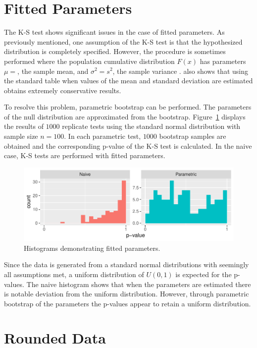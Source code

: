\documentclass[12pt, letterpaper, titlepage]{article}
\makeatletter
\newcommand*{\Xbar}{}%
\DeclareRobustCommand*{\Xbar}{%
  \mathpalette\@Xbar{}%
}
\newcommand*{\@Xbar}[2]{%
  \sbox0{$#1\mathrm{X}\m@th$}%
  \sbox2{$#1X\m@th$}%
  \rlap{%
    \hbox to\wd2{%
      \hfill
      $\overline{%
        \vrule width 0pt height\ht0 %
        \kern\wd0 %
      }$%
    }%
  }%
  \copy2 %
}
\makeatother
\begin{document}
\hypertarget{sec:fitted}{%
\section{Fitted Parameters}\label{sec:fitted}}

The K-S test shows significant issues in the case of fitted parameters. As previously mentioned, one assumption of the K-S test is that the hypothesized distribution is completely specified. However, the procedure is sometimes performed where the population cumulative distribution $F(x)$ has parameters $\mu=\Xbar$, the sample mean, and $\sigma^2=s^2$, the sample variance \citep{Lilliefors}. \citet{Lilliefors} also shows that using the standard table when values of the mean and standard deviation are estimated obtains extremely conservative results. 

To resolve this problem, parametric bootstrap can be performed. The parameters of the null distribution are approximated from the bootstrap. Figure~\ref{fig:hist_parametric} displays the results of $1000$ replicate tests using the standard normal distribution with sample size $n=100$. In each parametric test, $1000$ bootstrap samples are obtained and the corresponding p-value of the K-S test is calculated. In the naive case, K-S tests are performed with fitted parameters.

\begin{figure}[tbp]
  \centering
  \includegraphics{hist_parametric}
  \caption{Histograms demonstrating fitted parameters.}
  \label{fig:hist_parametric}
\end{figure}

Since the data is generated from a standard normal distributions with seemingly all assumptions met, a uniform distribution of $U(0,1)$ is expected for the p-values. The naive histogram shows that when the parameters are estimated there is notable deviation from the uniform distribution. However, through parametric bootstrap of the parameters the p-values appear to retain a uniform distribution.

\hypertarget{sec:rounded}{%
\section{Rounded Data}\label{sec:rounded}}
\end{document}
